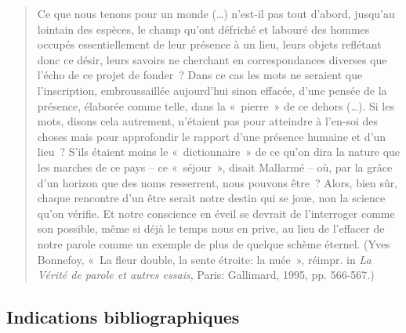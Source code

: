 	\begin{quote}
    Ce que nous tenons pour un monde (…) n’est-il pas tout d’abord, jusqu’au lointain des espèces, le champ qu’ont défriché et labouré des hommes occupés essentiellement de leur présence à un lieu, leurs objets reflétant donc ce désir, leurs savoirs ne cherchant en correspondances diverses que l’écho de ce projet de fonder ? Dans ce cas les mots ne seraient que l’inscription, embroussaillée aujourd'hui sinon effacée, d’une pensée de la présence, élaborée comme telle, dans la « pierre » de ce dehors (…). Si les mots, disons cela autrement, n’étaient pas pour atteindre à l’en-soi des choses mais pour approfondir le rapport d’une présence humaine et d'un lieu ? S’ils étaient moins le « dictionnaire » de ce qu’on dira la nature que les marches de ce pays – ce « séjour », disait Mallarmé – où, par la grâce d'un horizon que des noms resserrent, nous pouvons être ? Alors, bien sûr, chaque rencontre d'un être serait notre destin qui se joue, non la science qu’on vérifie. Et notre conscience en éveil se devrait de l’interroger comme son possible, même si déjà le temps nous en prive, au lieu de l’effacer de notre parole comme un exemple de plus de quelque schème éternel. (Yves Bonnefoy, « La fleur double, la sente étroite: la nuée », réimpr. in \emph{La Vérité de parole et autres essais}, Paris: Gallimard, 1995, pp. 566-567.)
\end{quote}

\subsection*{Indications bibliographiques}

